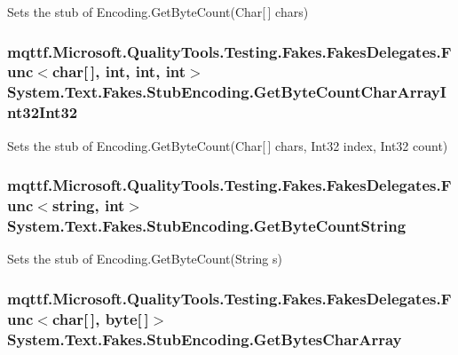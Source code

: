 Sets the stub of Encoding.\-Get\-Byte\-Count(\-Char\mbox{[}$\,$\mbox{]} chars)

\hypertarget{class_system_1_1_text_1_1_fakes_1_1_stub_encoding_aa36720c5f4e417c16c9e1ff53df1a77b}{
\subsubsection[{Get\-Byte\-Count\-Char\-Array\-Int32\-Int32}]{\setlength{\rightskip}{0pt plus 5cm}mqttf.\-Microsoft.\-Quality\-Tools.\-Testing.\-Fakes.\-Fakes\-Delegates.\-Func$<$char\mbox{[}$\,$\mbox{]}, int, int, int$>$ System.\-Text.\-Fakes.\-Stub\-Encoding.\-Get\-Byte\-Count\-Char\-Array\-Int32\-Int32}}\label{class_system_1_1_text_1_1_fakes_1_1_stub_encoding_aa36720c5f4e417c16c9e1ff53df1a77b}


Sets the stub of Encoding.\-Get\-Byte\-Count(\-Char\mbox{[}$\,$\mbox{]} chars, Int32 index, Int32 count)

\hypertarget{class_system_1_1_text_1_1_fakes_1_1_stub_encoding_a55dd93a2401047a5d1d2ffcf203491e9}{
\subsubsection[{Get\-Byte\-Count\-String}]{\setlength{\rightskip}{0pt plus 5cm}mqttf.\-Microsoft.\-Quality\-Tools.\-Testing.\-Fakes.\-Fakes\-Delegates.\-Func$<$string, int$>$ System.\-Text.\-Fakes.\-Stub\-Encoding.\-Get\-Byte\-Count\-String}}\label{class_system_1_1_text_1_1_fakes_1_1_stub_encoding_a55dd93a2401047a5d1d2ffcf203491e9}


Sets the stub of Encoding.\-Get\-Byte\-Count(\-String s)

\hypertarget{class_system_1_1_text_1_1_fakes_1_1_stub_encoding_af0328e3bd2119d208de18c27bb2cdcaa}{
\subsubsection[{Get\-Bytes\-Char\-Array}]{\setlength{\rightskip}{0pt plus 5cm}mqttf.\-Microsoft.\-Quality\-Tools.\-Testing.\-Fakes.\-Fakes\-Delegates.\-Func$<$char\mbox{[}$\,$\mbox{]}, byte\mbox{[}$\,$\mbox{]}$>$ System.\-Text.\-Fakes.\-Stub\-Encoding.\-Get\-Bytes\-Char\-Array}}\label{class_system_1_1_text_1_1_fakes_1_1_stub_encoding_af0328e3bd2119d208de18c27bb2cdcaa}


